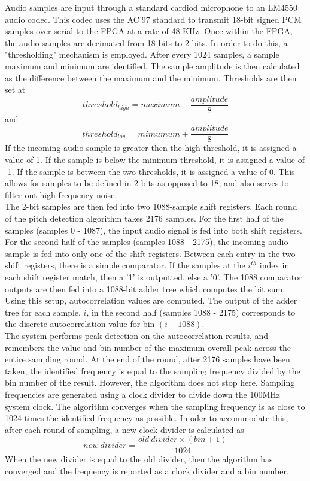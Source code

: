 \documentclass[aps,letterpaper,10pt]{revtex4}
\begin{document}
Audio samples are input through a standard cardiod microphone to an LM4550 audio codec. This codec uses the AC'97 standard to transmit 18-bit signed PCM samples over serial to the FPGA at  a rate of 48 KHz. Once within the FPGA, the audio samples are decimated from 18 bits to 2 bits. In order to do this, a "thresholding" mechanism is employed. After every 1024 samples, a sample maximum and minimum are identified. The sample amplitude is then calculated as the difference between the maximum and the minimum. Thresholds are then set at
$$ threshold_{high} = maximum - \frac{amplitude}{8}$$ and $$threshold_{low} = mimumum + \frac{amplitude}{8}$$
If the incoming audio sample is greater then the high threshold, it is assigned a value of 1. If the sample is below the minimum threshold, it is assigned a value of -1. If the sample is between the two thresholds, it is assigned a value of 0. This allows for samples to be defined in 2 bits as opposed to 18, and also serves to filter out high frequency noise. \\

The 2-bit samples are then fed into two 1088-sample shift registers. Each round of the pitch detection algorithm takes 2176 samples. For the first half of the samples (samples 0 - 1087), the input audio signal is fed into both shift registers. For the second half of the samples (samples 1088 - 2175), the incoming audio sample is fed into only one of the shift registers. Between each entry in the two shift registers, there is a simple comparator. If the samples at the $i^{th}$ index in each shift register match, then a '1' is outputted, else a '0'. The 1088 comparator outputs are then fed into a 1088-bit adder tree which computes the bit sum. Using this setup, autocorrelation values are computed. The output of the adder tree for each sample, $i$, in the second half (samples 1088 - 2175) corresponds to the discrete autocorrelation value for bin $(i - 1088)$. \\

The system performs peak detection on the autocorrelation results, and remembers the value and bin number of the maximum overall peak across the entire sampling round. At the end of the round, after 2176 samples have been taken, the identified frequency is equal to the sampling frequency divided by the bin number of the result. However, the algorithm does not stop here. Sampling frequencies are generated using a clock divider to divide down the 100MHz system clock. The algorithm converges when the sampling frequency is as close to 1024 times the identified frequency as possible. In oder to accommodate this, after each round of sampling, a new clock divider is calculated as 
$$new~divider = \frac{old~divider \times (bin + 1)}{1024}$$
When the new divider is equal to the old divider, then the algorithm has converged and the frequency is reported as a clock divider and a bin number.\\
\end{document}
